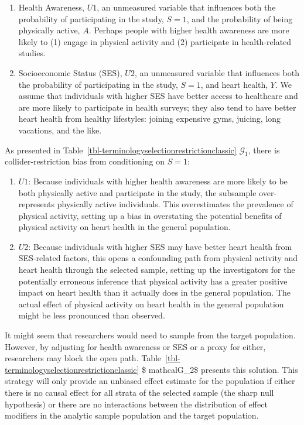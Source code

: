 \documentclass[
  single column]{article}
\begin{document}
\begin{enumerate}
\def\labelenumi{\arabic{enumi}.}
\item
  Health Awareness, \(U1\), an unmeasured variable that influences both
  the probability of participating in the study, \(\boxed{S = 1}\), and
  the probability of being physically active, \(A\). Perhaps people with
  higher health awareness are more likely to (1) engage in physical
  activity and (2) participate in health-related studies.
\item
  Socioeconomic Status (SES), \(U2\), an unmeasured variable that
  influences both the probability of participating in the study,
  \(\boxed{S = 1}\), and heart health, \(Y\). We assume that individuals
  with higher SES have better access to healthcare and are more likely
  to participate in health surveys; they also tend to have better heart
  health from healthy lifestyles: joining expensive gyms, juicing, long
  vacations, and the like.
\end{enumerate}

As presented in Table~\ref{tbl-terminologyselectionrestrictionclassic}
\(\mathcal{G}_1\), there is collider-restriction bias from conditioning
on \(S=1\):

\begin{enumerate}
\def\labelenumi{\arabic{enumi}.}
\item
  \textbf{\(U1\)}: Because individuals with higher health awareness are
  more likely to be both physically active and participate in the study,
  the subsample over-represents physically active individuals. This
  overestimates the prevalence of physical activity, setting up a bias
  in overstating the potential benefits of physical activity on heart
  health in the general population.
\item
  \textbf{\(U2\)}: Because individuals with higher SES may have better
  heart health from SES-related factors, this opens a confounding path
  from physical activity and heart health through the selected sample,
  setting up the investigators for the potentially erroneous inference
  that physical activity has a greater positive impact on heart health
  than it actually does in the general population. The actual effect of
  physical activity on heart health in the general population might be
  less pronounced than observed.
\end{enumerate}

It might seem that researchers would need to sample from the target
population. However, by adjusting for health awareness or SES or a proxy
for either, researchers may block the open path.
Table~\ref{tbl-terminologyselectionrestrictionclassic} \$ mathcalG\_2\$
presents this solution. This strategy will only provide an unbiased
effect estimate for the population if either there is no causal effect
for all strata of the selected sample (the sharp null hypothesis) or
there are no interactions between the distribution of effect modifiers
in the analytic sample population and the target population.
\end{document}
